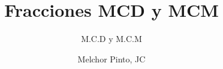 \documentclass{guia}
\title{Fracciones MCD y MCM}
\subtitle{M.C.D y M.C.M}
\author{Melchor Pinto, JC}
\begin{document}
%
\begin{questions}
\questionboxed{}
\end{questions}
\end{document}
